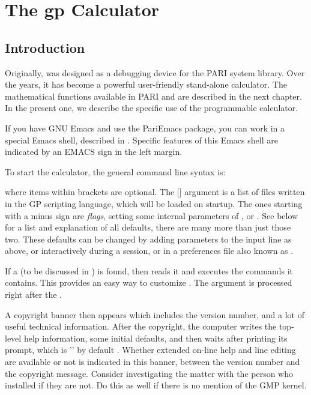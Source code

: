 %
%
\chapter{The gp Calculator}

\section{Introduction}

Originally,  was designed as a debugging device for the PARI system
library. Over the years, it has become a powerful user-friendly stand-alone
calculator. The mathematical functions available in PARI and  are
described in the next chapter. In the present one, we describe the specific
use of the  programmable calculator.

\emacs If you have GNU Emacs and use the PariEmacs package, you can work in a
special Emacs shell, described in . Specific features of
this Emacs shell are indicated by an EMACS sign in the left margin.


To start the calculator, the general command line syntax is:


\noindent
where items within brackets are optional. The [] argument is a
list of files written in the GP scripting language, which will be loaded on
startup. The ones starting with a minus sign are \emph{flags}, setting some
internal parameters of , or . See 
below for a list and explanation of all defaults, there are many more than
just those two. These defaults can be changed by adding parameters to the
input line as above, or interactively during a  session, or in a
preferences file also known as .

If a  (to be discussed in ) is
found,  then reads it and executes the commands it contains. This
provides an easy way to customize . The  argument is
processed right after the .

A copyright banner then appears which includes the version number, and a lot
of useful technical information. After the copyright, the computer writes the
top-level help information, some initial defaults, and then waits after
printing its prompt, which is '' by default . Whether extended
on-line help and line editing are available or not is indicated in this
 banner, between the version number and the copyright message.
Consider investigating the matter with the person who installed  if
they are not. Do this as well if there is no mention of the GMP kernel.

